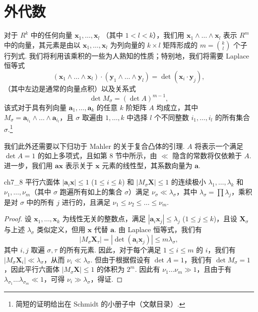 \section{外代数}\label{sec:ch7_9}

对于 $R^k$ 中的任何向量 $\mathbf{x}_1, \dots, \mathbf{x}_l$ （其中 $1 < l < k$），我们用 $\mathbf{x}_1 \wedge \dots \wedge \mathbf{x}_l$ 表示 $R^m$ 中的向量，其元素是由以 $\mathbf{x}_1, \dots, \mathbf{x}_l$ 为列向量的 $k \times l$ 矩阵形成的 $m = \binom{k}{l}$ 个子行列式. 我们将利用该乘积的一些为人熟知的性质；特别地，我们将需要 Laplace 恒等式
\[( \mathbf{x}_1 \wedge \dots \wedge \mathbf{x}_l ) \cdot ( \mathbf{y}_1 \wedge \dots \wedge \mathbf{y}_l ) = \operatorname{det}(\mathbf{x}_i \cdot \mathbf{y}_j),\]
（其中左边是通常的向量点积）以及关系式
\[\operatorname{det} M_\sigma = (\operatorname{det} A)^{m-1},\]
该式对于具有列向量 $\mathbf{a}_1, \dots, \mathbf{a}_k$ 的任意 $k$ 阶矩阵 $A$ 均成立，其中 $M_\sigma = \mathbf{a}_{i_1} \wedge \dots \wedge \mathbf{a}_{i_l}$，且 $\sigma$ 取遍由 $1, \dots, k$ 中选择 $l$ 个不同整数 $i_1, \dots, i_l$ 的所有集合 $\sigma$.\footnote{简短的证明给出在 Schmidt 的小册子中（文献目录）.}

我们此外还需要以下归功于 Mahler 的关于复合凸体的引理. $A$ 将表示一个满足 $\det A = 1$ 的如上多项式，且如第 8 节中所示，由 $\ll$ 隐含的常数将仅依赖于 $A$. 进一步，我们用 $\mathbf{a}\mathbf{x}$ 表示关于 $\mathbf{x}$ 元素的线性型，其系数向量为 $\mathbf{a}$.

\begin{mylemma}{}{ch7_8}
平行六面体 $|\mathbf{a}_i \mathbf{x}| \le 1$ ($1 \le i \le k$) 和 $|M_\sigma \mathbf{X}| \le 1$ 的连续极小 $\lambda_1, \dots, \lambda_k$ 和 $\nu_1, \dots, \nu_m$（其中 $\sigma$ 跑遍所有如上的集合 $\sigma$）满足 $\nu_\sigma \ll \lambda_\sigma$，其中 $\lambda_\sigma = \prod \lambda_j$，乘积是对 $\sigma$ 中的所有 $j$ 进行的，且满足 $\nu_1 \le \nu_2 \le \dots \le \nu_m$.
\end{mylemma}

\begin{proof}
设 $\mathbf{x}_1, \ldots, \mathbf{x}_k$ 为线性无关的整数点，满足 $|\mathbf{a}_i \mathbf{x}_j| \le \lambda_j$ ($1 \le j \le k$)，且设 $\mathbf{X}_\sigma$ 与上述 $\lambda_\sigma$ 类似定义，但用 $\mathbf{x}$ 代替 $\mathbf{a}$. 由 Laplace 恒等式，我们有
\[|M_\sigma \mathbf{X}_\tau| = |\operatorname{det}(\mathbf{a}_i \mathbf{x}_j)| \leqslant m \lambda_\sigma,\]
其中 $i, j$ 取遍 $\sigma, \tau$ 的所有元素. 因此，对于每个满足 $1 \leqslant i \leqslant m$ 的 $i$，我们有 $|M_\sigma \mathbf{X}_i| \ll \lambda_\sigma$，从而 $\nu_i \ll \lambda_\sigma$. 但由于根据假设有 $\det A = 1$，我们有 $\det M_\sigma = 1$，因此平行六面体 $|M_\sigma \mathbf{X}| \leqslant 1$ 的体积为 $2^m$. 因此有 $\nu_1 \dots \nu_m \gg 1$，且由于有 $\lambda_{\sigma_1} \dots \lambda_{\sigma_m} \ll 1$，可得 $\nu_i \gg \lambda_\sigma$，得证.
\end{proof}

